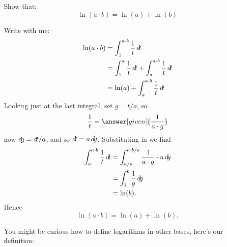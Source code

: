 \documentclass{ximera}
\begin{document}
\begin{example}
  Show that:
  \[
  \ln(a\cdot b) = \ln(a) + \ln(b)
  \]
  \begin{explanation}
    Write with me:
    \begin{align*}
      \ln(a\cdot b) &= \int_1^{a\cdot b} \frac{1}{t}\d t\\
      &= \int_1^{a} \frac{1}{t}\d t + \int_a^{a\cdot b} \frac{1}{t}\d t\\
      &= \ln(a) + \int_a^{a\cdot b} \frac{1}{t}\d t
    \end{align*}
    Looking just at the last integral, set $g= t/a$, so
    \[
    \frac{1}{t} = \answer[given]{\frac{1}{a\cdot g}}
    \]
    now $\mathop{}\!d\! g = \mathop{}\!d\! t/a$, and so $\mathop{}\!d\! t= a \mathop{}\!d\! g$. Substituting in we find
    \begin{align*}
      \int_a^{a\cdot b} \frac{1}{t}\mathop{}\!d\! t &= \int_{a/a}^{a\cdot b/a} \frac{1}{a \cdot g} \cdot a \mathop{}\!d\! g\\
      &= \int_{1}^{b} \frac{1}{g}\mathop{}\!d\! g\\
      &= \ln(b).
    \end{align*}
    Hence
    \[
    \ln(a\cdot b) = \ln(a) + \ln(b).
    \]
  \end{explanation}
\end{example}

You might be curious how to define logarithms in other bases, here's
our definition:
\end{document}
